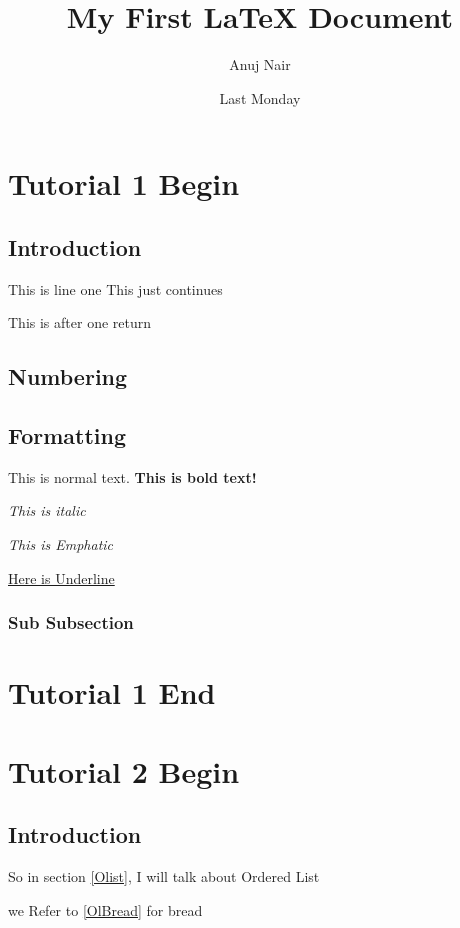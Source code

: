 \documentclass{article}
\author{Anuj Nair}
\title{My First {\LaTeX} Document}
\date{Last Monday}
\begin{document}
\maketitle

\section{Tutorial 1 Begin}

\subsection{Introduction}

This is line one
This just continues

This is after one return  


\subsection{Numbering}

\subsection{Formatting}

This is normal text. \textbf{This is bold text!}

\textit{This is italic}

\emph{This is Emphatic}

\underline{Here is Underline}

\subsubsection{Sub Subsection}


\section{Tutorial 1 End}

\section{Tutorial 2 Begin}

\subsection{Introduction}

 So in section \ref{Olist}, I will talk about Ordered List

we Refer to \ref{OlBread} for bread
\end{document}
